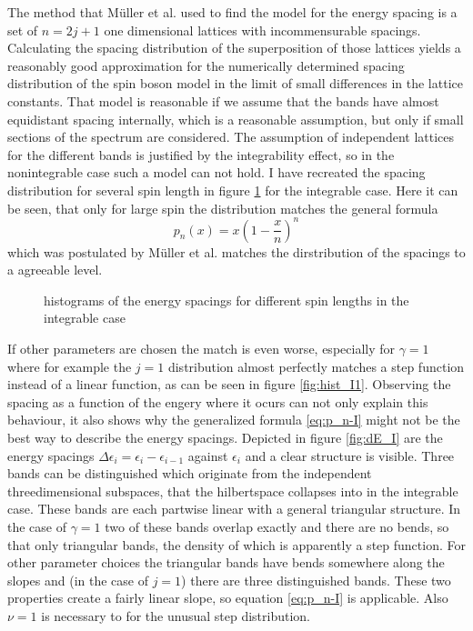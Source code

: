 The method that Müller et al. used to find the model for the energy spacing is a set of $n = 2j+1$ one dimensional lattices with incommensurable spacings. 
Calculating the spacing distribution of the superposition of those lattices yields a reasonably good approximation for the numerically determined spacing distribution of the spin boson model in the limit of small differences in the lattice constants.
That model is reasonable if we assume that the bands have almost equidistant spacing internally, which is a reasonable assumption, but only if small sections of the spectrum are considered.
The assumption of independent lattices for the different bands is justified by the integrability effect, so in the nonintegrable case such a model can not hold.
I have recreated the spacing distribution for several spin length in figure \ref{fig:hist_I0.5} for the integrable case.
Here it can be seen, that only for large spin the distribution matches the general formula
\begin{equation}
  p_n (x) = x \left( 1 - \frac{x}{n}\right)^n \label{eq:p_n-I}
\end{equation}
which was postulated by Müller et al. matches the dirstribution of the spacings to a agreeable level.
\begin{figure}[h]
  \centering
  
  \caption{histograms of the energy spacings for different spin lengths in the integrable case}\label{fig:hist_I0.5}
\end{figure}
If other parameters are chosen the match is even worse, especially for $\gamma = 1$ where for example the $j=1$ distribution almost perfectly matches a step function instead of a linear function, as can be seen in figure \ref{fig:hist_I1}.
Observing the spacing as a function of the engery where it ocurs can not only explain this behaviour, it also shows why the generalized formula \eqref{eq:p_n-I} might not be the best way to describe the energy spacings.
Depicted in figure \ref{fig:dE_I} are the energy spacings $\Delta \epsilon_i = \epsilon_i - \epsilon_{i-1}$ against $\epsilon_i$ and a clear structure is visible.
Three bands can be distinguished which originate from the independent threedimensional subspaces, that the hilbertspace collapses into in the integrable case.
These bands are each partwise linear with a general triangular structure.
In the case of $\gamma = 1$ two of these bands overlap exactly and there are no bends, so that only triangular bands, the density of which is apparently a step function.
For other parameter choices the triangular bands have bends somewhere along the slopes and (in the case of $j = 1$) there are three distinguished bands.
These two properties create a fairly linear slope, so equation \eqref{eq:p_n-I} is applicable.
Also $\nu = 1$ is necessary to for the unusual step distribution.

